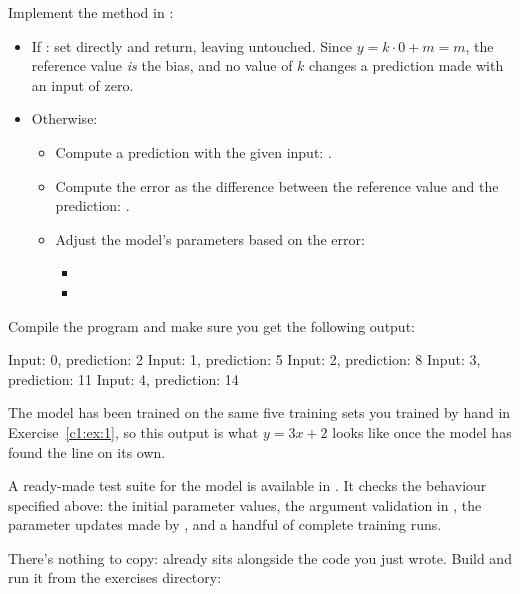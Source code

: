 \label{c1:ex:13}
Implement the method  in :
\begin{itemize}
  \item If : set  directly and return, leaving
     untouched. Since $y = k \cdot 0 + m = m$, the reference value \emph{is} the
    bias, and no value of $k$ changes a prediction made with an input of zero.
  \item Otherwise:
  \begin{itemize}
    \item Compute a prediction with the given input:
      .
    \item Compute the error as the difference between the reference value and the prediction:
      .
    \item Adjust the model's parameters based on the error:
    \begin{itemize}
      \item {}
      \item {}
    \end{itemize}
  \end{itemize}
\end{itemize}

\label{c1:ex:14}
Compile the program and make sure you get the following output:

\begin{console}
Input: 0, prediction: 2
Input: 1, prediction: 5
Input: 2, prediction: 8
Input: 3, prediction: 11
Input: 4, prediction: 14
\end{console}

\noindent The model has been trained on the same five training sets you trained by hand in
Exercise~\ref{c1:ex:1}, so this output is what $y = 3x + 2$ looks like once the model has found the
line on its own.

\label{c1:ex:15}
A ready-made test suite for the model is available in . It checks
the behaviour specified above: the initial parameter values, the argument validation in
, the parameter updates made by , and a handful of complete training
runs.

There's nothing to copy:  already sits alongside the code you just wrote. Build and run
it from the exercises directory:

